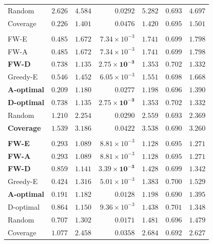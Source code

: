 \documentclass[letterpaper, 9
 pt, conference]{ieeeconf}
\begin{document}
\begin{table}[ht]
\begin{tabular}{lrrrrrr}
Random & $2.626$ & $4.584$ & $0.0292$ & $5.282$ & $0.693$ & $4.697$ \\
Coverage & $0.226$ & $1.401$ & $0.0476$ & $1.420$ & $0.695$ & $1.501$ \\
\addlinespace[1pt]
\multicolumn{7}{l}{\textit{$K{=}15$}} \\[1pt]
FW-E & $0.485$ & $1.672$ & $7.34\!\times\!10^{-3}$ & $1.741$ & $0.699$ & $1.798$ \\
FW-A & $0.485$ & $1.672$ & $7.34\!\times\!10^{-3}$ & $1.741$ & $0.699$ & $1.798$ \\
\textbf{FW-D} & $0.738$ & $\mathbf{1.135}$ & $\mathbf{2.75\!\times\!10^{-3}}$ & $1.353$ & $0.702$ & $\mathbf{1.332}$ \\
Greedy-E & $0.546$ & $1.452$ & $6.05\!\times\!10^{-3}$ & $1.551$ & $0.698$ & $1.668$ \\
\textbf{A-optimal} & $\mathbf{0.209}$ & $1.180$ & $0.0277$ & $\mathbf{1.198}$ & $0.696$ & $1.390$ \\
\textbf{D-optimal} & $0.738$ & $\mathbf{1.135}$ & $\mathbf{2.75\!\times\!10^{-3}}$ & $1.353$ & $0.702$ & $\mathbf{1.332}$ \\
Random & $1.210$ & $2.254$ & $0.0290$ & $2.559$ & $0.693$ & $2.369$ \\
\textbf{Coverage} & $1.539$ & $3.186$ & $0.0422$ & $3.538$ & $\mathbf{0.690}$ & $3.260$ \\
\addlinespace[1pt]
\multicolumn{7}{l}{\textit{$K{=}20$}} \\[1pt]
\textbf{FW-E} & $0.293$ & $\mathbf{1.089}$ & $8.81\!\times\!10^{-3}$ & $\mathbf{1.128}$ & $0.695$ & $\mathbf{1.271}$ \\
\textbf{FW-A} & $0.293$ & $\mathbf{1.089}$ & $8.81\!\times\!10^{-3}$ & $\mathbf{1.128}$ & $0.695$ & $\mathbf{1.271}$ \\
\textbf{FW-D} & $0.859$ & $1.141$ & $\mathbf{3.39\!\times\!10^{-3}}$ & $1.428$ & $0.699$ & $1.342$ \\
Greedy-E & $0.424$ & $1.316$ & $5.01\!\times\!10^{-3}$ & $1.383$ & $0.700$ & $1.529$ \\
\textbf{A-optimal} & $\mathbf{0.191}$ & $1.182$ & $0.0128$ & $1.198$ & $\mathbf{0.690}$ & $1.395$ \\
D-optimal & $0.864$ & $1.150$ & $9.36\!\times\!10^{-3}$ & $1.438$ & $0.701$ & $1.348$ \\
Random & $0.707$ & $1.302$ & $0.0171$ & $1.481$ & $0.696$ & $1.479$ \\
Coverage & $1.077$ & $2.458$ & $0.0358$ & $2.684$ & $0.692$ & $2.627$ \\

\end{tabular}
\end{table}
\end{document}
